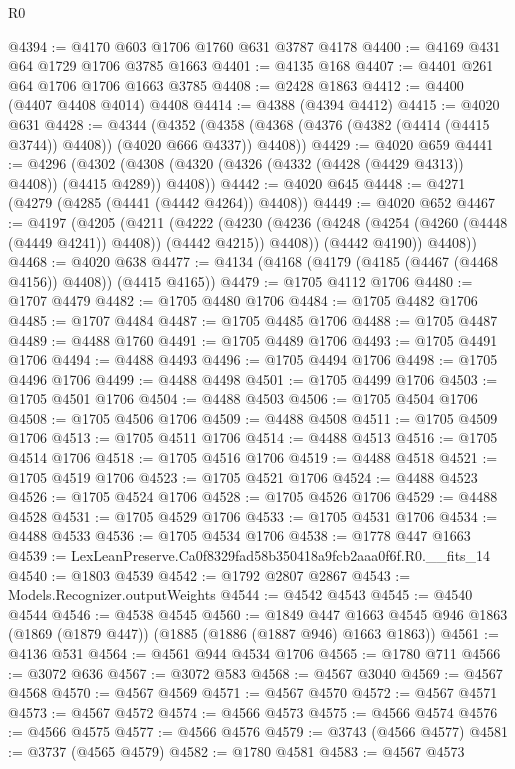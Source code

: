 \begin{lexlean}{R0}
\begin{coremodule}
@4394 := @4170 @603 @1706 @1760 @631 @3787 @4178
@4400 := @4169 @431 @64 @1729 @1706 @3785 @1663
@4401 := @4135 @168
@4407 := @4401 @261 @64 @1706 @1706 @1663 @3785
@4408 := @2428 @1863
@4412 := @4400 (@4407 @4408 @4014) @4408
@4414 := @4388 (@4394 @4412)
@4415 := @4020 @631
@4428 := @4344
    (@4352 (@4358 (@4368 (@4376 (@4382 (@4414 (@4415 @3744)) @4408)) (@4020 @666 @4337)) @4408))
@4429 := @4020 @659
@4441 := @4296
    (@4302 (@4308 (@4320 (@4326 (@4332 (@4428 (@4429 @4313)) @4408)) (@4415 @4289)) @4408))
@4442 := @4020 @645
@4448 := @4271 (@4279 (@4285 (@4441 (@4442 @4264)) @4408))
@4449 := @4020 @652
@4467 := @4197
    (@4205
      (@4211
        (@4222
          (@4230 (@4236 (@4248 (@4254 (@4260 (@4448 (@4449 @4241)) @4408)) (@4442 @4215)) @4408))
          (@4442 @4190))
        @4408))
@4468 := @4020 @638
@4477 := @4134 (@4168 (@4179 (@4185 (@4467 (@4468 @4156)) @4408)) (@4415 @4165))
@4479 := @1705 @4112 @1706
@4480 := @1707 @4479
@4482 := @1705 @4480 @1706
@4484 := @1705 @4482 @1706
@4485 := @1707 @4484
@4487 := @1705 @4485 @1706
@4488 := @1705 @4487
@4489 := @4488 @1760
@4491 := @1705 @4489 @1706
@4493 := @1705 @4491 @1706
@4494 := @4488 @4493
@4496 := @1705 @4494 @1706
@4498 := @1705 @4496 @1706
@4499 := @4488 @4498
@4501 := @1705 @4499 @1706
@4503 := @1705 @4501 @1706
@4504 := @4488 @4503
@4506 := @1705 @4504 @1706
@4508 := @1705 @4506 @1706
@4509 := @4488 @4508
@4511 := @1705 @4509 @1706
@4513 := @1705 @4511 @1706
@4514 := @4488 @4513
@4516 := @1705 @4514 @1706
@4518 := @1705 @4516 @1706
@4519 := @4488 @4518
@4521 := @1705 @4519 @1706
@4523 := @1705 @4521 @1706
@4524 := @4488 @4523
@4526 := @1705 @4524 @1706
@4528 := @1705 @4526 @1706
@4529 := @4488 @4528
@4531 := @1705 @4529 @1706
@4533 := @1705 @4531 @1706
@4534 := @4488 @4533
@4536 := @1705 @4534 @1706
@4538 := @1778 @447 @1663
@4539 := LexLeanPreserve.Ca0f8329fad58b350418a9fcb2aaa0f6f.R0.__fits_14
@4540 := @1803 @4539
@4542 := @1792 @2807 @2867
@4543 := Models.Recognizer.outputWeights
@4544 := @4542 @4543
@4545 := @4540 @4544
@4546 := @4538 @4545
@4560 := @1849
    @447
    @1663
    @4545
    @946
    @1863
    (@1869 (@1879 @447))
    (@1885 (@1886 (@1887 @946) @1663 @1863))
@4561 := @4136 @531
@4564 := @4561 @944 @4534 @1706
@4565 := @1780 @711
@4566 := @3072 @636
@4567 := @3072 @583
@4568 := @4567 @3040
@4569 := @4567 @4568
@4570 := @4567 @4569
@4571 := @4567 @4570
@4572 := @4567 @4571
@4573 := @4567 @4572
@4574 := @4566 @4573
@4575 := @4566 @4574
@4576 := @4566 @4575
@4577 := @4566 @4576
@4579 := @3743 (@4566 @4577)
@4581 := @3737 (@4565 @4579)
@4582 := @1780 @4581
@4583 := @4567 @4573

\end{coremodule}
\end{lexlean}
